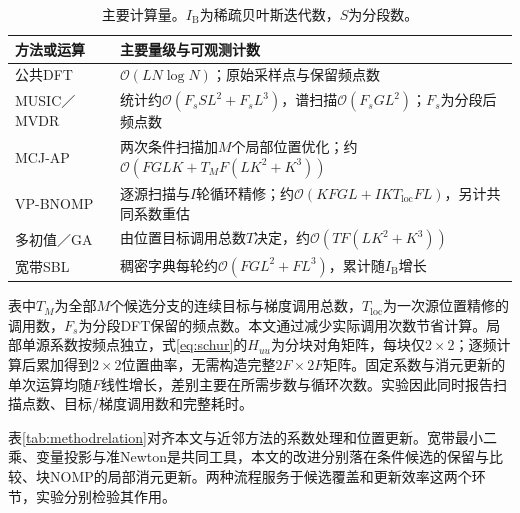 \documentclass[a4paper,fleqn]{cas-sc}
\numberwithin{equation}{section}
\numberwithin{figure}{section}
\numberwithin{table}{section}
\begin{document}
\begin{table}[pos=htbp]
\centering\small
\caption{主要计算量。$I_{\mathrm B}$为稀疏贝叶斯迭代数，$S$为分段数。}\label{tab:complexity}
\begin{tabularx}{\linewidth}{@{}lX@{}}\toprule
方法或运算 & 主要量级与可观测计数\\\midrule
公共DFT & $\mathcal O(LN\log N)$；原始采样点与保留频点数\\
MUSIC／MVDR & 统计约$\mathcal O(F_sSL^2+F_sL^3)$，谱扫描$\mathcal O(F_sGL^2)$；$F_s$为分段后频点数\\
MCJ-AP & 两次条件扫描加$M$个局部位置优化；约$\mathcal O(FGLK+T_MF(LK^2+K^3))$\\
VP-BNOMP & 逐源扫描与$I$轮循环精修；约$\mathcal O(KFGL+IKT_{\mathrm{loc}}FL)$，另计共同系数重估\\
多初值／GA & 由位置目标调用总数$T$决定，约$\mathcal O(TF(LK^2+K^3))$\\
宽带SBL & 稠密字典每轮约$\mathcal O(FGL^2+FL^3)$，累计随$I_{\mathrm B}$增长\\\bottomrule
\end{tabularx}
\end{table}
表中$T_M$为全部$M$个候选分支的连续目标与梯度调用总数，$T_{\mathrm{loc}}$为一次源位置精修的调用数，$F_s$为分段DFT保留的频点数。本文通过减少实际调用次数节省计算。局部单源系数按频点独立，式\eqref{eq:schur}的$H_{uu}$为分块对角矩阵，每块仅$2\times2$；逐频计算后累加得到$2\times2$位置曲率，无需构造完整$2F\times2F$矩阵。固定系数与消元更新的单次运算均随$F$线性增长，差别主要在所需步数与循环次数。实验因此同时报告扫描点数、目标/梯度调用数和完整耗时。

表\ref{tab:methodrelation}对齐本文与近邻方法的系数处理和位置更新。宽带最小二乘、变量投影与准Newton是共同工具，本文的改进分别落在条件候选的保留与比较、块NOMP的局部消元更新。两种流程服务于候选覆盖和更新效率这两个环节，实验分别检验其作用。
\end{document}
